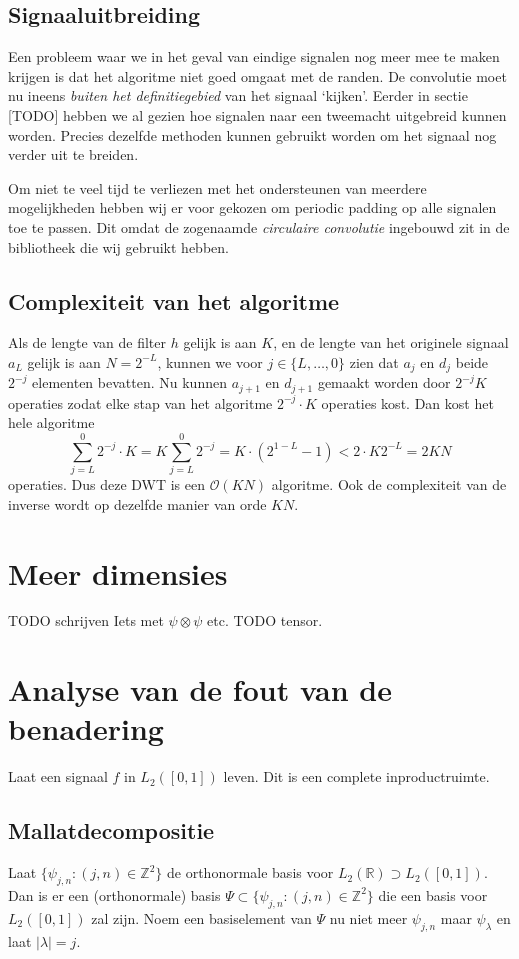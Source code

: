 \documentclass[11pt]{amsart}
\newcommand{\R}{\mathbb{R}}
\newcommand{\Z}{\mathbb{Z}}
\begin{document}
\subsection{Signaaluitbreiding}
Een probleem waar we in het geval van eindige signalen nog meer mee te maken krijgen is dat het algoritme niet goed omgaat met de randen. De convolutie moet nu ineens \emph{buiten het definitiegebied} van het signaal `kijken'. Eerder in sectie [TODO] hebben we al gezien hoe signalen naar een tweemacht uitgebreid kunnen worden. Precies dezelfde methoden kunnen gebruikt worden om het signaal nog verder uit te breiden. 

Om niet te veel tijd te verliezen met het ondersteunen van meerdere mogelijkheden hebben wij er voor gekozen om periodic padding op alle signalen toe te passen. Dit omdat de zogenaamde \emph{circulaire convolutie} ingebouwd zit in de bibliotheek die wij gebruikt hebben.

\subsection{Complexiteit van het algoritme}
Als de lengte van de filter $h$ gelijk is aan $K$, en de lengte van het originele signaal $a_L$ gelijk is aan $N = 2^{-L}$, kunnen we voor $j \in \{L, \ldots, 0\}$ zien dat $a_j$ en $d_j$ beide $2^{-j}$ elementen bevatten. Nu kunnen $a_{j+1}$ en $d_{j+1}$ gemaakt worden door $2^{-j}K$ operaties zodat elke stap van het algoritme $2^{-j} \cdot K$ operaties kost. Dan kost het hele algoritme
\[
	\sum_{j=L}^0 2^{-j} \cdot K = K \sum_{j=L}^0 2^{-j} = K \cdot (2^{1-L} - 1) < 2 \cdot K 2^{-L} = 2KN
\]
operaties. Dus deze DWT is een $\mathcal{O}(KN)$ algoritme. Ook de complexiteit van de inverse wordt op dezelfde manier van orde $KN$. 

\section{Meer dimensies}
TODO schrijven
Iets met $\psi \otimes \psi$ etc.
TODO tensor.

\section{Analyse van de fout van de benadering}
Laat een signaal $f$ in $L_2([0,1])$ leven. Dit is een complete inproductruimte. 

\subsection{Mallatdecompositie}
Laat $\{ \psi_{j,n}: (j,n) \in \Z^2 \}$ de orthonormale basis voor $L_2(\R) \supset L_2([0,1])$. Dan is er een (orthonormale) basis $\Psi \subset \{ \psi_{j,n}: (j,n) \in \Z^2 \}$ die een basis voor $L_2([0,1])$ zal zijn. Noem een basiselement van $\Psi$ nu niet meer $\psi_{j,n}$ maar $\psi_\lambda$ en laat $|\lambda| = j$.
\end{document}
